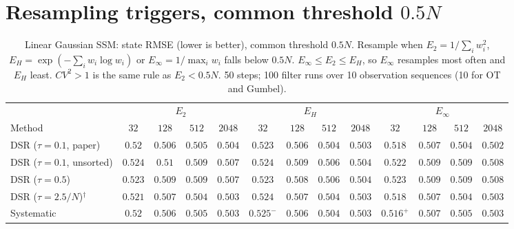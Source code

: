 \clearpage
\section*{Resampling triggers, common threshold $0.5N$}

\begin{table}[ht]
\centering
\small
\caption{Linear Gaussian SSM: state RMSE (lower is better), common threshold $0.5N$. Resample when $E_2=1/\sum_iw_i^2$, $E_H=\exp(-\sum_iw_i\log w_i)$ or $E_\infty=1/\max_iw_i$ falls below $0.5N$. $E_\infty\le E_2\le E_H$, so $E_\infty$ resamples most often and $E_H$ least. $CV^2>1$ is the same rule as $E_2<0.5N$. 50 steps; 100 filter runs over 10 observation sequences (10 for OT and Gumbel).}
\label{tab:trigger-fixed-linear-rmse}
\begin{adjustbox}{max width=\linewidth}
\begin{tabular}{lcccc|cccc|cccc}
\toprule
 & \multicolumn{4}{c}{$E_2$} & \multicolumn{4}{c}{$E_H$} & \multicolumn{4}{c}{$E_\infty$} \\
\cmidrule(lr){2-5} \cmidrule(lr){6-9} \cmidrule(lr){10-13}
Method & $32$ & $128$ & $512$ & $2048$ & $32$ & $128$ & $512$ & $2048$ & $32$ & $128$ & $512$ & $2048$ \\
\midrule
DSR ($\tau{=}0.1$, paper) & $0.52$ & $0.506$ & $0.505$ & $0.504$ & $0.523$ & $\mathbf{0.506}$ & $0.504$ & $0.503$ & $\mathbf{0.518}$ & $0.507$ & $\mathbf{0.504}$ & $\mathbf{0.502}$ \\
DSR ($\tau{=}0.1$, unsorted) & $0.524$ & $0.51$ & $0.509$ & $0.507$ & $0.524$ & $\mathbf{0.509}$ & $\mathbf{0.506}$ & $\mathbf{0.504}$ & $\mathbf{0.522}$ & $0.509$ & $0.509$ & $0.508$ \\
DSR ($\tau{=}0.5$) & $0.523$ & $0.509$ & $0.509$ & $0.507$ & $0.523$ & $\mathbf{0.508}$ & $\mathbf{0.506}$ & $\mathbf{0.504}$ & $\mathbf{0.523}$ & $0.509$ & $0.509$ & $0.508$ \\
DSR ($\tau{=}2.5/N$)$^\dagger$ & $0.521$ & $\mathbf{0.507}$ & $0.504$ & $0.503$ & $0.524$ & $0.507$ & $0.504$ & $0.503$ & $\mathbf{0.518}$ & $0.507$ & $\mathbf{0.504}$ & $\mathbf{0.503}$ \\
\midrule
Systematic & $0.52$ & $\mathbf{0.506}$ & $0.505$ & $\mathbf{0.503}$ & $0.525^{-}$ & $0.506$ & $\mathbf{0.504}$ & $0.503$ & $\mathbf{0.516}^{+}$ & $0.507$ & $0.505$ & $0.503$ \\

\end{tabular}
\end{adjustbox}
\end{table}
